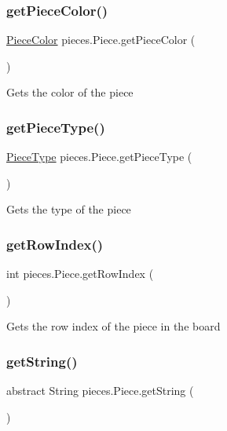 \subsubsection{\texorpdfstring{get\+Piece\+Color()}{getPieceColor()}}
{\footnotesize\ttfamily \mbox{\hyperlink{enumpieces_1_1_piece_1_1_piece_color}{Piece\+Color}} pieces.\+Piece.\+get\+Piece\+Color (\begin{DoxyParamCaption}{ }\end{DoxyParamCaption})}

Gets the color of the piece \mbox{\label{classpieces_1_1_piece_acd116a1f6e774bc7d358780c098fadcb}} 
\subsubsection{\texorpdfstring{get\+Piece\+Type()}{getPieceType()}}
{\footnotesize\ttfamily \mbox{\hyperlink{enumpieces_1_1_piece_1_1_piece_type}{Piece\+Type}} pieces.\+Piece.\+get\+Piece\+Type (\begin{DoxyParamCaption}{ }\end{DoxyParamCaption})}

Gets the type of the piece \mbox{\label{classpieces_1_1_piece_a298b5268de024c41b2af48306fa40e03}} 
\subsubsection{\texorpdfstring{get\+Row\+Index()}{getRowIndex()}}
{\footnotesize\ttfamily int pieces.\+Piece.\+get\+Row\+Index (\begin{DoxyParamCaption}{ }\end{DoxyParamCaption})}

Gets the row index of the piece in the board \mbox{\label{classpieces_1_1_piece_a12cbd905036c427015bd3c62fdb17036}} 
\subsubsection{\texorpdfstring{get\+String()}{getString()}}
{\footnotesize\ttfamily abstract String pieces.\+Piece.\+get\+String (\begin{DoxyParamCaption}{ }\end{DoxyParamCaption})\hspace{0.3cm}{\ttfamily [abstract]}}

